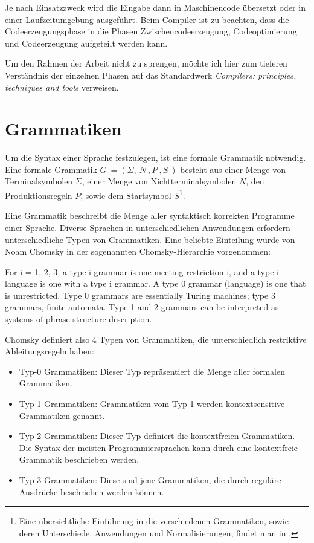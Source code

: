 Je nach Einsatzzweck wird die Eingabe dann in Maschinencode übersetzt oder in einer Laufzeitumgebung ausgeführt. Beim Compiler ist zu beachten, dass die Codeerzeugungsphase in die Phasen Zwischencodeerzeugung, Codeoptimierung und Codeerzeugung aufgeteilt werden kann. 

Um den Rahmen der Arbeit nicht zu sprengen, möchte ich hier zum tieferen Verständnis der einzelnen Phasen auf das Standardwerk \emph{Compilers: principles, techniques and tools}\cite{AhSe86} verweisen.


\section{Grammatiken}

Um die Syntax einer Sprache festzulegen, ist eine formale Grammatik not\-wen\-dig. Eine formale Grammatik $G \ = (\Sigma,\ N\ ,P\ ,S\ )$ besteht aus einer Menge von Terminalsymbolen $\Sigma$, einer Menge von Nichtterminalsymbolen $N$, den Produktionsregeln $P$, sowie dem Startsymbol $S$\footnote{Eine übersichtliche Ein\-füh\-rung in die verschiedenen Grammatiken, sowie deren Unterschiede, Anwendungen und Normalisierungen, findet man in \cite{VoWi02}.}.

Eine Grammatik beschreibt die Menge aller syntaktisch korrekten Programme einer Sprache. Diverse Sprachen in unterschiedlichen Anwendungen erfordern unterschiedliche Typen von Grammatiken. Eine beliebte Einteilung wurde von Noam Chomsky in der sogenannten Chomsky-Hierarchie vorgenommen:

\begin{myquote}For i = 1, 2, 3, a type i grammar is one meeting restriction i, and a type i language is one with a type i grammar. A type 0 grammar (language) is one that is unrestricted. 
Type 0 grammars are essentially Turing machines; type 3 grammars, finite automata. Type 1 and 2 grammars can be interpreted as systems of phrase structure description. \cite{Chom59}
\end{myquote}

Chomsky definiert also 4 Typen von Grammatiken, die unterschiedlich restriktive Ab\-lei\-tungs\-re\-geln haben:

\begin{itemize}
  \item Typ-0 Grammatiken: Dieser Typ repräsentiert die Menge aller formalen Grammatiken.
  \item Typ-1 Grammatiken: Grammatiken vom Typ 1 werden kontextsensitive Grammatiken genannt.
  \item Typ-2 Grammatiken: Dieser Typ definiert die kontextfreien Grammatiken. Die Syntax der meisten Programmiersprachen kann durch eine kontextfreie Grammatik beschrieben werden.
  \item Typ-3 Grammatiken: Diese sind jene Grammatiken, die durch reguläre Ausdrücke beschrieben werden können.
\end{itemize}

